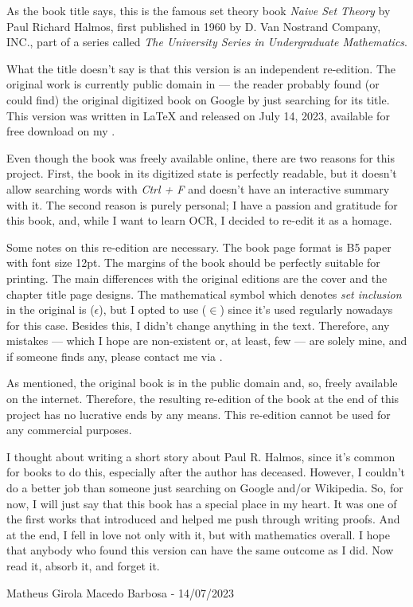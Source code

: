 As the book title says, this is the famous set theory book \textit{Naive Set Theory} by Paul Richard Halmos, first published in 1960 by D. Van Nostrand Company, INC., part of a series called \textit{ The University Series in Undergraduate Mathematics}.

What the title doesn't say is that this version is an independent re-edition. The original work is currently public domain in \href{https://babel.hathitrust.org}{\color{blue}{Hathi Trust Digital Library}} — the reader probably found (or could find) the original digitized book on Google by just searching for its title. This version was written in LaTeX and released on July 14, 2023, available for free download on my \href{https://github.com/matheusgirola/Halmos-Naive-Set-Theory-OCR-LaTeX-Reedition}{\color{blue}{Github repository}}.

Even though the book was freely available online, there are two reasons for this project. First, the book in its digitized state is perfectly readable, but it doesn't allow searching words with \textit{Ctrl + F} and doesn't have an interactive summary with it. The second reason is purely personal; I have a passion and gratitude for this book, and, while I want to learn OCR, I decided to re-edit it as a homage.

Some notes on this re-edition are necessary. The book page format is B5 paper with font size 12pt. The margins of the book should be perfectly suitable for printing. The main differences with the original editions are the cover and the chapter title page designs. The mathematical symbol which denotes \textit{set inclusion} in the original is ($\epsilon$), but I opted to use ($\in$) since it's used regularly nowadays for this case. Besides this, I didn't change anything in the text. Therefore, any mistakes — which I hope are non-existent or, at least, few —  are solely mine, and if someone finds any, please contact me via  \href{mailto:matheusgirola@gmail.com}{\color{blue}{e-mail}}.

As mentioned, the original book is in the public domain and, so, freely available on the internet. Therefore, the resulting re-edition of the book at the end of this project has no lucrative ends by any means. This re-edition cannot be used for any commercial purposes.

I thought about writing a short story about Paul R. Halmos, since it's common for books to do this, especially after the author has deceased. However, I couldn't do a better job than someone just searching on Google and/or Wikipedia. So, for now, I will just say that this book has a special place in my heart. It was one of the first works that introduced and helped me push through writing proofs. And at the end, I fell in love not only with it, but with mathematics overall. I hope that anybody who found this version can have the same outcome as I did. Now read it, absorb it, and forget it.

\begin{flushright}
Matheus Girola Macedo Barbosa - 14/07/2023
\end{flushright}
